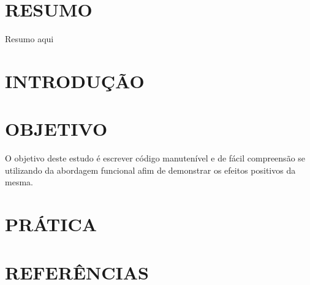 \documentclass[date,twocolumn,a4paper]{ppgem}
\begin{document}
    \thispagestyle{plain}
    \makeheader

    \newcommand{\listoffiguras}{\listof{figlisting}{Lista de Figuras}} %

    \newcommand{\listofcodigos}{\lstlistoflistings} %


    \section*{RESUMO}
    Resumo aqui

    \section{INTRODUÇÃO}


    \section{OBJETIVO}
    O objetivo deste estudo é escrever código manutenível e de fácil compreensão se utilizando da abordagem funcional
    afim de demonstrar os efeitos positivos da mesma.

    

    
    
    \section{PRÁTICA}

    

    

    

    
    
    \section{REFERÊNCIAS}\\
    
\end{document}
